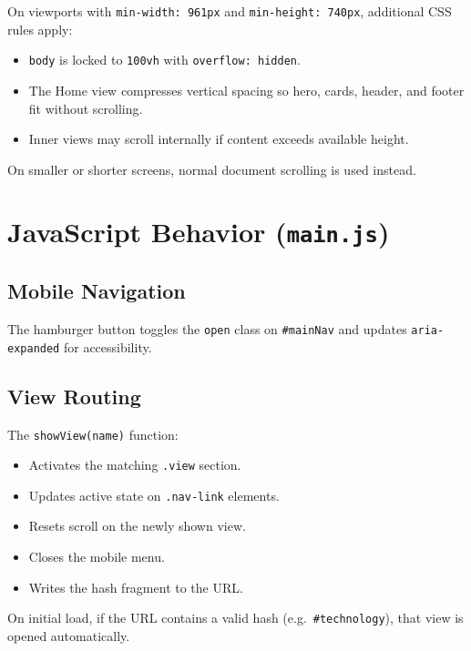 \documentclass[11pt,a4paper]{article}
\begin{document}
On viewports with \texttt{min-width: 961px} and \texttt{min-height: 740px},
additional CSS rules apply:

\begin{itemize}[noitemsep]
  \item \texttt{body} is locked to \texttt{100vh} with \texttt{overflow: hidden}.
  \item The Home view compresses vertical spacing so hero, cards, header, and
        footer fit without scrolling.
  \item Inner views may scroll internally if content exceeds available height.
\end{itemize}

On smaller or shorter screens, normal document scrolling is used instead.

\section{JavaScript Behavior (\texttt{main.js})}

\subsection{Mobile Navigation}

The hamburger button toggles the \texttt{open} class on \texttt{\#mainNav} and
updates \texttt{aria-expanded} for accessibility.

\subsection{View Routing}

The \texttt{showView(name)} function:

\begin{itemize}[noitemsep]
  \item Activates the matching \texttt{.view} section.
  \item Updates active state on \texttt{.nav-link} elements.
  \item Resets scroll on the newly shown view.
  \item Closes the mobile menu.
  \item Writes the hash fragment to the URL.
\end{itemize}

On initial load, if the URL contains a valid hash (e.g.\ \texttt{\#technology}),
that view is opened automatically.
\end{document}
